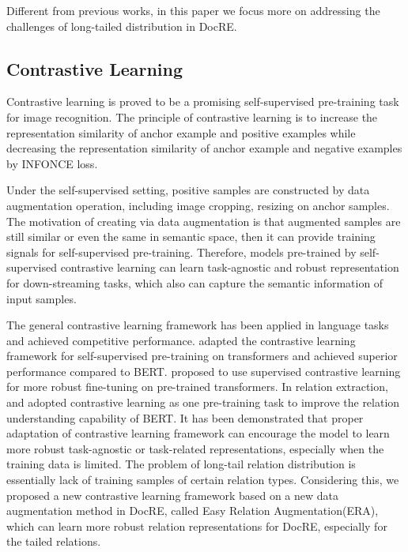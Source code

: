 \documentclass[11pt]{article}
\begin{document}
Different from previous works, in this paper we focus more on addressing the challenges of long-tailed distribution in DocRE. 
\subsection{Contrastive Learning}
\label{sec:contrastive-learning-background}
Contrastive learning is proved to be a promising self-supervised pre-training task for image recognition\citep{pmlr-v119-chen20j,he_momentum_2020}.
The principle of contrastive learning is to increase the representation similarity of anchor example  and positive examples  while decreasing the representation similarity of anchor example  and negative examples  by INFONCE loss\citep{Oord_INFONCE_2018}. 


Under the self-supervised setting, positive samples  are constructed by data augmentation operation, including image cropping, resizing on anchor samples. The motivation of creating  via data augmentation is that augmented samples are still similar or even the same in semantic space, then it can provide training signals for self-supervised pre-training. Therefore, models pre-trained by self-supervised contrastive learning can learn task-agnostic and robust representation for down-streaming tasks, which also can capture the semantic information of input samples.

The general contrastive learning framework has been applied in language tasks and achieved competitive performance.  \citet{fang_cert_2020} adapted the contrastive learning framework for self-supervised pre-training on transformers and achieved superior performance compared to BERT\cite{devlin-etal-2019-bert}. \citet{sclnlp_gunel_2021} proposed to use supervised contrastive learning for more robust fine-tuning on pre-trained transformers. In relation extraction, \citet{peng-etal-2020-learning} and \citet{qin-etal-2021-erica} adopted contrastive learning as one pre-training task to improve the relation understanding capability of BERT. It has been demonstrated that proper adaptation of contrastive learning framework can encourage the model to learn more robust task-agnostic or task-related representations, especially when the training data is limited. The problem of long-tail relation distribution is essentially lack of training samples of certain relation types. Considering this, we proposed a new contrastive learning framework based on a new data augmentation method in DocRE, called Easy Relation Augmentation(ERA), which can learn more robust relation representations for DocRE, especially for the tailed relations.
\end{document}
